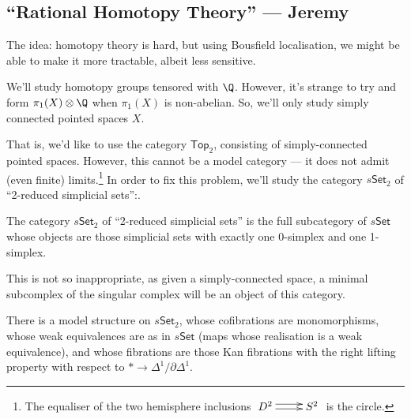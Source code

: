 \documentclass[11pt]{article}
\newcommand{\KanSemResponse}[1]
{
\thispagestyle{fancy}
\subsection*{#1}
}
\begin{document}
\begin{JeremyRationalHomotopyPractice}
\KanSemResponse
{``Rational Homotopy Theory'' --- Jeremy}
The idea: homotopy theory is hard, but using Bousfield localisation, we might be able to make it more tractable, albeit less sensitive.

We'll study homotopy groups tensored with $\Q$. However, it's strange to try and form $\pi_1(X)\otimes\Q$ when $\pi_1(X)$ is non-abelian. So, we'll only study simply connected pointed spaces $X$.

That is, we'd like to use the category $\mathsf{Top}_2$, consisting of simply-connected pointed spaces. However, this cannot be a model category --- it does not admit (even finite) limits.\footnote{The equaliser of the two hemisphere inclusions $\xymatrix{D^2\ar@<1mm>[r]\ar@<-.5mm>[r]&S^2}$ is the circle.}
In order to fix this problem, we'll study the category $s\mathsf{Set}_2$ of ``2-reduced simplicial sets'':. 
\begin{defn*}
The category $s\mathsf{Set}_2$ of ``2-reduced simplicial sets'' is the full subcategory of $s\mathsf{Set}$ whose objects are those simplicial sets with exactly one 0-simplex and one 1-simplex.
\end{defn*}
\noindent This is not so inappropriate, as given a simply-connected space, a minimal subcomplex of the singular complex will be an object of this category.
\begin{prop*}
There is a model structure on $s\mathsf{Set}_2$, whose cofibrations are monomorphisms, whose weak equivalences are as in $s\mathsf{Set}$ (maps whose realisation is a weak equivalence), and whose fibrations are those Kan fibrations with the right lifting property with respect to $*\to\Delta^1/\partial\Delta^1$. 
\end{prop*}

\end{JeremyRationalHomotopyPractice}
\end{document}

